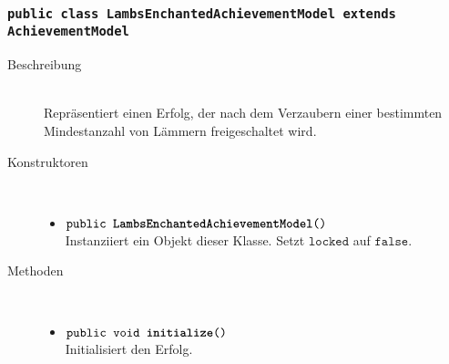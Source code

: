 \subsubsection{\normalfont \texttt{public class \textbf{LambsEnchantedAchievementModel} extends AchievementModel}}

\begin{description}
\item[Beschreibung] \hfill \\ Repräsentiert einen Erfolg, der nach dem Verzaubern einer bestimmten Mindestanzahl von Lämmern freigeschaltet wird.

\item[Konstruktoren] \hfill \\
	\vspace{-.8cm}
	\begin{itemize}
		\item $\texttt{public \textbf{LambsEnchantedAchievementModel}()}$ \\ Instanziiert ein Objekt dieser Klasse. Setzt $\texttt{locked}$ auf $\texttt{false}$.
	\end{itemize}
	
\item[Methoden] \hfill \\
	\vspace{-.8cm}
	\begin{itemize}
				\item $\texttt{public void \textbf{initialize}()}$ \\ Initialisiert den Erfolg.
		

\end{itemize}
\end{description}
